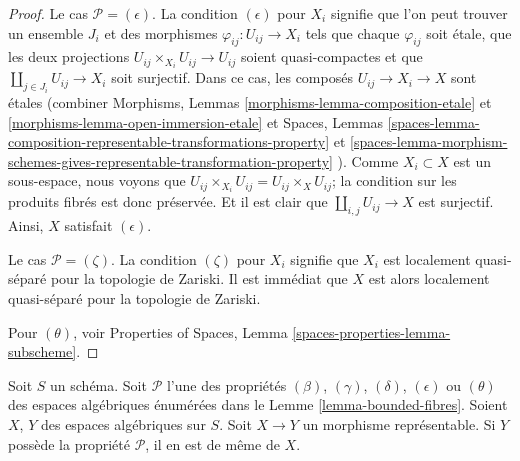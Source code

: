 \begin{proof}
\medskip\noindent
Le cas $\mathcal{P} = (\epsilon)$. La condition $(\epsilon)$ pour $X_i$
signifie que l'on peut trouver un ensemble $J_i$ et des morphismes
$\varphi_{ij} : U_{ij} \to X_i$ tels que chaque $\varphi_{ij}$ soit étale,
que les deux projections $U_{ij} \times_{X_i} U_{ij} \to U_{ij}$ soient
quasi-compactes et que $\coprod_{j \in J_i} U_{ij} \to X_i$ soit surjectif.
Dans ce cas, les composés $U_{ij} \to X_i \to X$ sont étales
(combiner
Morphisms, Lemmas
\ref{morphisms-lemma-composition-etale} et
\ref{morphisms-lemma-open-immersion-etale}
et
Spaces, Lemmas
\ref{spaces-lemma-composition-representable-transformations-property} et
\ref{spaces-lemma-morphism-schemes-gives-representable-transformation-property}
).
Comme $X_i \subset X$ est un sous-espace, nous voyons que
$U_{ij} \times_{X_i} U_{ij} = U_{ij} \times_X U_{ij}$; la condition sur
les produits fibrés est donc préservée. Et il est clair que
$\coprod_{i, j} U_{ij} \to X$ est surjectif. Ainsi, $X$
satisfait $(\epsilon)$.

\medskip\noindent
Le cas $\mathcal{P} = (\zeta)$. La condition $(\zeta)$ pour $X_i$ signifie
que $X_i$ est localement quasi-séparé pour la topologie de Zariski.
Il est immédiat que $X$ est alors localement quasi-séparé pour la
topologie de Zariski.

\medskip\noindent
Pour $(\theta)$, voir
Properties of Spaces,
Lemma \ref{spaces-properties-lemma-subscheme}.
\end{proof}

\begin{lemma}
\label{lemma-representable-properties}
Soit $S$ un schéma. Soit $\mathcal{P}$ l'une des propriétés
$(\beta)$, $(\gamma)$, $(\delta)$, $(\epsilon)$ ou
$(\theta)$ des espaces algébriques énumérées dans le
Lemme \ref{lemma-bounded-fibres}.
Soient $X$, $Y$ des espaces algébriques sur $S$.
Soit $X \to Y$ un morphisme représentable.
Si $Y$ possède la propriété $\mathcal{P}$, il en est de même de $X$.
\end{lemma}

